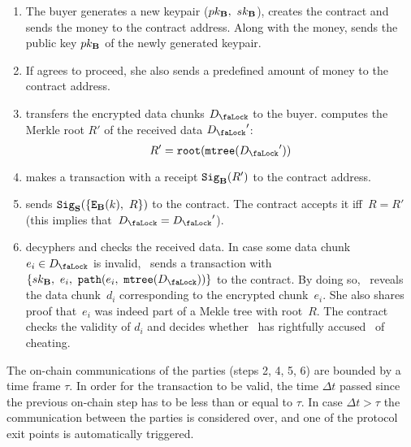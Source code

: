 \begin{enumerate}
\item The buyer generates a new keypair ($pk_{\mathbf{B}},\ sk_{\mathbf{B}}$), creates the contract and sends the money to the contract address. Along with the money,  sends the public key $pk_{\mathbf{B}}$ of the newly generated keypair.
\item If  agrees to proceed, she also sends a predefined amount of money to the contract address.
\item {} transfers the encrypted data chunks $\Lock$ to the buyer.  computes the Merkle root $R'$ of the received data $\Lock'$:
\begin{equation}
R' = \Root(\MerkleTree(\Lock'))
\end{equation}
\item {} makes a transaction with a receipt $\mathtt{Sig}_{\mathbf{B}}(R')$ to the contract address.
\item {} sends $\Sign_\Party{S}(\{\Encrypt_\Party{B}(k),\ R\})$ to the contract. The contract accepts it iff~$R=R'$ (this implies that~$\Lock=\Lock'$).
\item {} decyphers and checks the received data. In case some data chunk $e_i \in \Lock$ is invalid, ~sends a transaction with~$\{\SecretKey{B},\ e_i,\ \Path(e_i,\ \MerkleTree(\Lock))\}$ to the contract. By doing so, ~reveals the data chunk~$d_i$ corresponding to the encrypted chunk~$e_i$.  She also shares proof that~$e_i$ was indeed part of a  Mekle tree with root~$R$. The contract checks the validity of $d_i$ and decides whether ~has rightfully accused~ of cheating.
\end{enumerate}

The on-chain communications of the parties (steps 2, 4, 5, 6) are bounded by a time frame $\tau$. In order for the transaction to be valid, the time $\Delta t$ passed since the previous on-chain step has to be less than or equal to $\tau$. In case $\Delta t > \tau$ the communication between the parties is considered over, and one of the protocol exit points is automatically triggered.

